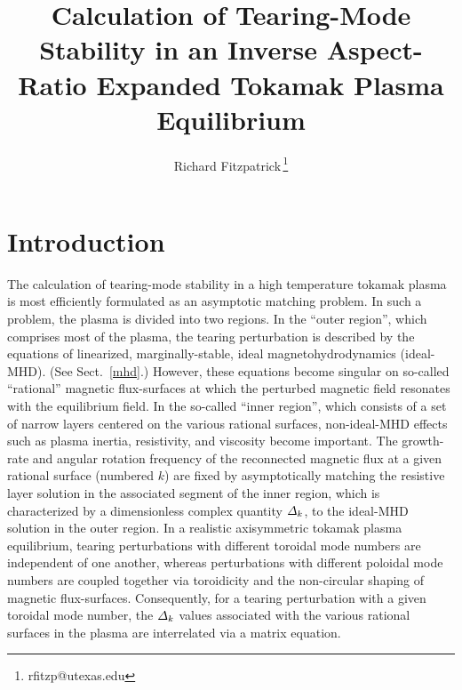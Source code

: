 \documentclass[12pt,prb,aps]{revtex4-1}
\begin{document}
\title{Calculation of Tearing-Mode Stability in an Inverse Aspect-Ratio Expanded Tokamak Plasma Equilibrium}
\author{Richard Fitzpatrick\,\footnote{rfitzp@utexas.edu}}

\maketitle

\section{Introduction} 
The calculation of tearing-mode stability in a high temperature tokamak plasma is most efficiently formulated as  an asymptotic
matching problem.\cite{fkr} In such a problem, the  plasma is  divided into two regions. In the ``outer region'', which comprises most
of the plasma, the tearing perturbation is described by the equations of linearized, marginally-stable, ideal magnetohydrodynamics (ideal-MHD). (See Sect.~\ref{mhd}.)
However, these equations become singular on so-called ``rational'' magnetic flux-surfaces at which the perturbed magnetic field resonates with the equilibrium field. In the so-called ``inner region'', which
consists of a set of narrow layers centered on the various rational surfaces, non-ideal-MHD effects such as plasma inertia, resistivity, and
viscosity become important. The growth-rate and angular rotation frequency of the reconnected magnetic flux at a given rational
surface (numbered $k$) are fixed by asymptotically matching the resistive layer
solution in the associated segment of the inner region, which is characterized by a dimensionless complex quantity ${\mit\Delta}_k$,  to the ideal-MHD solution in the outer region. In a realistic axisymmetric tokamak  plasma equilibrium, tearing
perturbations with different toroidal mode numbers are independent of one another, whereas perturbations with different poloidal
mode numbers are coupled together via toroidicity and the non-circular shaping of magnetic flux-surfaces.\cite{con0}
Consequently, for a tearing perturbation with a given toroidal mode number, 
 the ${\mit\Delta}_k$ values associated with  the various rational surfaces in the plasma are interrelated via a matrix equation.\cite{connor,cht,tokuda,brennan, ham,am1,am3}
\end{document}
